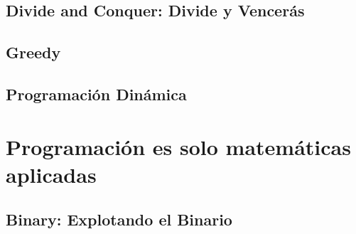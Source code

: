 \documentclass[12pt, fleqn]{report}                             %
\theoremstyle{break}                                            %
\begin{document}
\clearpage
\chapter{Divide and Conquer: Divide y Vencerás}


\clearpage
\chapter{Greedy}

\clearpage
\chapter{Programación Dinámica}



\part{Programación es solo matemáticas aplicadas}

    \clearpage
    \chapter{Binary: Explotando el Binario}
\end{document}
